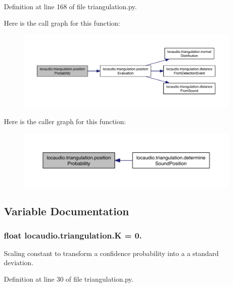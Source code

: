 Definition at line 168 of file triangulation.\-py.



Here is the call graph for this function\-:\nopagebreak
\begin{figure}[H]
\begin{center}
\leavevmode
\includegraphics[width=350pt]{namespacelocaudio_1_1triangulation_af708227f069b847392f730d13060cce8_cgraph}
\end{center}
\end{figure}




Here is the caller graph for this function\-:\nopagebreak
\begin{figure}[H]
\begin{center}
\leavevmode
\includegraphics[width=350pt]{namespacelocaudio_1_1triangulation_af708227f069b847392f730d13060cce8_icgraph}
\end{center}
\end{figure}




\subsection{Variable Documentation}
\hypertarget{namespacelocaudio_1_1triangulation_ac85bcbed961d15baa586ddc0192860bb}{
\subsubsection[{K}]{\setlength{\rightskip}{0pt plus 5cm}float locaudio.\-triangulation.\-K = 0.}}\label{namespacelocaudio_1_1triangulation_ac85bcbed961d15baa586ddc0192860bb}


Scaling constant to transform a confidence probability into a a standard deviation. 



Definition at line 30 of file triangulation.\-py.

